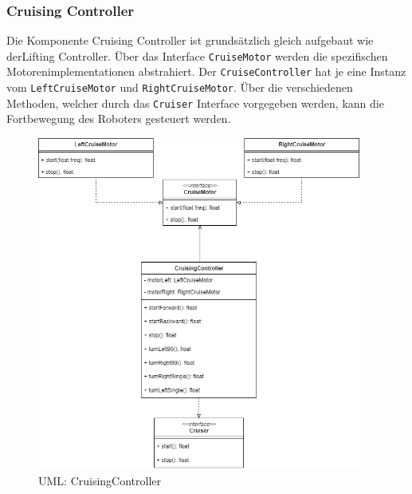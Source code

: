 \subsubsection{Cruising Controller}
Die Komponente Cruising Controller ist grundsätzlich gleich aufgebaut wie derLifting Controller. Über das Interface \texttt{CruiseMotor} werden die spezifischen Motorenimplementationen abstrahiert. Der \texttt{CruiseController} hat je eine Instanz vom \texttt{LeftCruiseMotor} und \texttt{RightCruiseMotor}. Über die verschiedenen Methoden, welcher durch das \texttt{Cruiser} Interface vorgegeben werden, kann die Fortbewegung des Roboters gesteuert werden.
\begin{figure}[H]
  \includegraphics[width=0.95\textwidth]{img/softwarearchitektur/UML-CruisingController.png}
  \centering
  \caption{UML: CruisingController}
  \label{fig:uml-cruising-controller}
\end{figure}

